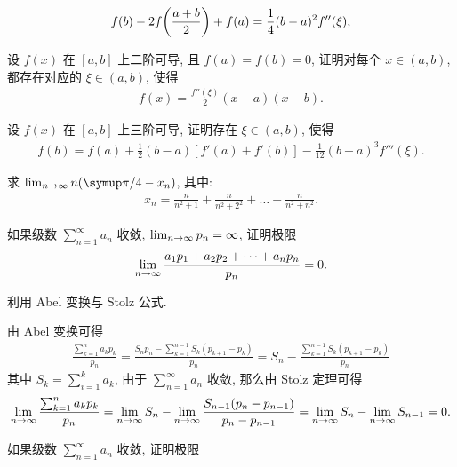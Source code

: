 \documentclass{ctexart}
\begin{document}
\begin{exercise}[series=exer]
\begin{align*}
        f(b) - 2f\qty(\frac{a + b}{2}) + f(a) = \frac{1}{4} (b - a)^{2} f''(\xi),
    \end{align*}
    \item 设 $ f(x) $ 在 $ [a, b] $ 上二阶可导, 且 $ f(a) = f(b)  = 0 $, 证明对每个 $ x \in (a, b) $, 都存在对应的 $ \xi \in (a, b) $, 使得
    \begin{align*}
        f(x) = \frac{f''(\xi)}{2} (x - a) (x - b).
    \end{align*}
    \item 设 $ f(x) $ 在 $ [a, b] $ 上三阶可导, 证明存在 $ \xi \in (a, b) $, 使得
    \begin{align*}
        f(b) = f(a) + \frac{1}{2} (b - a) [f'(a) + f'(b)] - \frac{1}{12} (b - a)^{3} f'''(\xi).
    \end{align*}
    \item 求 $ \limit{n}{\infty} n \qty(\pi/4 - x_{n}) $, 其中:
    \begin{align*}
        x_{n} = \frac{n}{n^{2} + 1} + \frac{n}{n^{2} + 2^{2}} + \dots + \frac{n}{n^{2} + n^{2}}.
    \end{align*}
    \item 如果级数 $ \sum_{n = 1}^{\infty} a_{n} $ 收敛, $ \lim_{n \to \infty} p_{n} = \infty $, 证明极限
    \begin{align*}
        \lim_{n \to \infty}\frac{a_{1} p_{1} + a_{2} p_{2} + \dots + a_{n} p_{n}}{p_{n}} = 0.
    \end{align*}
    \begin{hint}
        利用 Abel 变换与 Stolz 公式. 
    \end{hint}
    \begin{answer}
        由 Abel 变换可得
        \begin{align*}
            \frac{\sum_{k = 1}^{n} a_{k}p_{k}}{p_{n}} = \frac{S_{n}p_{n} - \sum_{k = 1}^{n - 1}S_{k}(p_{k + 1} - p_{k})}{p_{n}} = S_{n} - \frac{\sum_{k = 1}^{n - 1}S_{k}(p_{k + 1} - p_{k})}{p_{n}}
        \end{align*}
        其中 $ S_{k} = \sum_{i = 1}^{k}a_{k} $, 由于 $ \sum_{n = 1}^{\infty}a_{n} $ 收敛, 那么由 Stolz 定理可得
        \begin{align*}
            \lim_{n \to \infty}\frac{\sum_{k = 1}^{n} a_{k}p_{k}}{p_{n}} = \lim_{n \to \infty}S_{n} - \lim_{n \to \infty}\frac{S_{n - 1}(p_{n} - p_{n - 1})}{p_{n} - p_{n - 1}} = \lim_{n \to \infty}S_{n} - \lim_{n \to \infty}S_{n - 1} = 0.
        \end{align*}
    \end{answer}
    \item 如果级数 $ \sum_{n = 1}^{\infty} a_{n} $ 收敛, 证明极限

\end{exercise}
\end{document}
